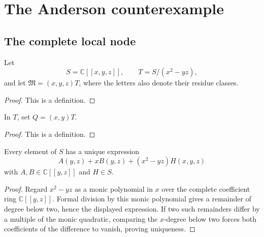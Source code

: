 \chapter{The Anderson counterexample}

\section{The complete local node}

\begin{definition}
  \label{def:node_ring}
  Let
  \[
    S=\mathbb C[[x,y,z]],\qquad
    T=S/(x^2-yz),
  \]
  and let \(\mathfrak M=(x,y,z)T\), where the letters also denote their
  residue classes.
\end{definition}

\begin{proof}
  This is a definition.
\end{proof}

\begin{definition}
  \label{def:node_prime}
  In \(T\), set \(Q=(x,y)T\).
\end{definition}

\begin{proof}
  This is a definition.
\end{proof}

\begin{lemma}
  \label{lem:node_normal_form}
  Every element of \(S\) has a unique expression
  \[
    A(y,z)+xB(y,z)+(x^2-yz)H(x,y,z)
  \]
  with \(A,B\in\mathbb C[[y,z]]\) and \(H\in S\).
\end{lemma}

\begin{proof}
  Regard \(x^2-yz\) as a monic polynomial in \(x\) over the complete
  coefficient ring \(\mathbb C[[y,z]]\).  Formal division by this monic
  polynomial gives a remainder of degree below two, hence the displayed
  expression.  If two such remainders differ by a multiple of the monic
  quadratic, comparing the \(x\)-degree below two forces both coefficients
  of the difference to vanish, proving uniqueness.
\end{proof}

